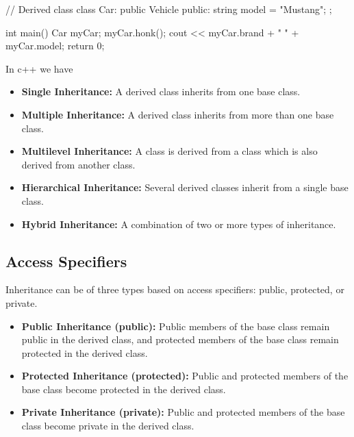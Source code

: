 \documentclass{report}
\begin{document}
\begin{concept}
\begin{cppcode}
// Derived class
class Car: public Vehicle {
  public:
    string model = "Mustang";
};

int main() {
  Car myCar;
  myCar.honk();
  cout << myCar.brand + " " + myCar.model;
  return 0;
}
    \end{cppcode}
    \bigbreak \noindent 
    In c++ we have
    \begin{itemize}
        \item \textbf{Single Inheritance:} A derived class inherits from one base class.
        \item \textbf{Multiple Inheritance:} A derived class inherits from more than one base class.
        \item \textbf{Multilevel Inheritance:} A class is derived from a class which is also derived from another class.
        \item \textbf{Hierarchical Inheritance:} Several derived classes inherit from a single base class.
        \item \textbf{Hybrid Inheritance:} A combination of two or more types of inheritance.
    \end{itemize}

    \pagebreak 
    \subsection{Access Specifiers}
    \bigbreak \noindent 
    Inheritance can be of three types based on access specifiers: public, protected, or private.
    \begin{itemize}
        \item \textbf{Public Inheritance (public):} Public members of the base class remain public in the derived class, and protected members of the base class remain protected in the derived class.
        \item \textbf{Protected Inheritance (protected):} Public and protected members of the base class become protected in the derived class.
        \item \textbf{Private Inheritance (private):} Public and protected members of the base class become private in the derived class.
    \end{itemize}

    \pagebreak

\end{concept}
\end{document}
